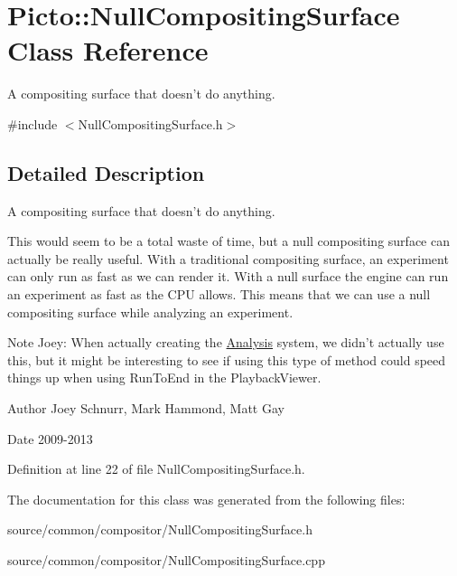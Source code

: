 \hypertarget{class_picto_1_1_null_compositing_surface}{\section{Picto\-:\-:Null\-Compositing\-Surface Class Reference}
\label{class_picto_1_1_null_compositing_surface}
}


A compositing surface that doesn't do anything.  




{\ttfamily \#include $<$Null\-Compositing\-Surface.\-h$>$}



\subsection{Detailed Description}
A compositing surface that doesn't do anything. 

This would seem to be a total waste of time, but a null compositing surface can actually be really useful. With a traditional compositing surface, an experiment can only run as fast as we can render it. With a null surface the engine can run an experiment as fast as the C\-P\-U allows. This means that we can use a null compositing surface while analyzing an experiment.

\begin{DoxyNote}{Note}
Joey\-: When actually creating the \hyperlink{class_picto_1_1_analysis}{Analysis} system, we didn't actually use this, but it might be interesting to see if using this type of method could speed things up when using Run\-To\-End in the Playback\-Viewer. 
\end{DoxyNote}
\begin{DoxyAuthor}{Author}
Joey Schnurr, Mark Hammond, Matt Gay 
\end{DoxyAuthor}
\begin{DoxyDate}{Date}
2009-\/2013 
\end{DoxyDate}


Definition at line 22 of file Null\-Compositing\-Surface.\-h.



The documentation for this class was generated from the following files\-:\begin{DoxyCompactItemize}
\item 
source/common/compositor/Null\-Compositing\-Surface.\-h\item 
source/common/compositor/Null\-Compositing\-Surface.\-cpp\end{DoxyCompactItemize}
